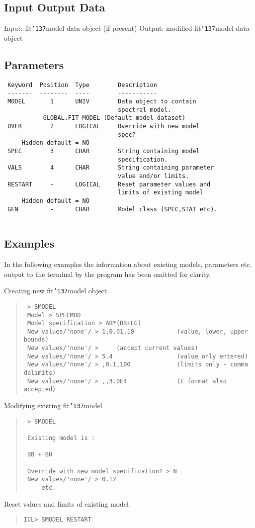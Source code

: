 \documentclass{book}
\renewcommand{\_}{{\tt\char'137}}     %
\begin{document}
\subsection{Input Output Data}
Input: fit\_model data object (if present)
Output: modified fit\_model data object
\subsection{Parameters}
\begin{verbatim}
 Keyword  Position  Type        Description
 -------  --------  ----        -----------
 MODEL       1      UNIV        Data object to contain
                                spectral model.
           GLOBAL.FIT_MODEL (Default model dataset)
 OVER        2      LOGICAL     Override with new model
                                spec?
     Hidden default = NO
 SPEC        3      CHAR        String containing model
                                specification.
 VALS        4      CHAR        String containing parameter
                                value and/or limits.
 RESTART     -      LOGICAL     Reset parameter values and
                                limits of existing model
     Hidden default = NO
 GEN         -      CHAR        Model class (SPEC,STAT etc).
 
\end{verbatim}\subsection{Examples}
In the following examples the information about existing models,
parameters etc. output to the terminal by the program has been
omitted for clarity.
 
Creating new fit\_model object
 
\begin{quote}\begin{verbatim}
 > SMODEL
 Model > SPECMOD
 Model specification > AB*(BR+LG)
 New values/'none'/ > 1,0.01,10            (value, lower, upper bounds)
 New values/'none'/ >     (accept current values)
 New values/'none'/ > 5.4                  (value only entered)
 New values/'none'/ > ,0.1,100             (limits only - comma delimits)
 New values/'none'/ > ,,3.0E4              (E format also accepted)
\end{verbatim}\end{quote}
Modifying existing fit\_model
\begin{quote}\begin{verbatim}
 > SMODEL
 
 Existing model is :
 
 BB + BH
 
 Override with new model specification? > N
 New values/'none'/ > 0.12
     etc.
\end{verbatim}\end{quote}
Reset values and limits of existing model
\begin{quote}\begin{verbatim}
ICL> SMODEL RESTART
\end{verbatim}\end{quote}
\end{document}
